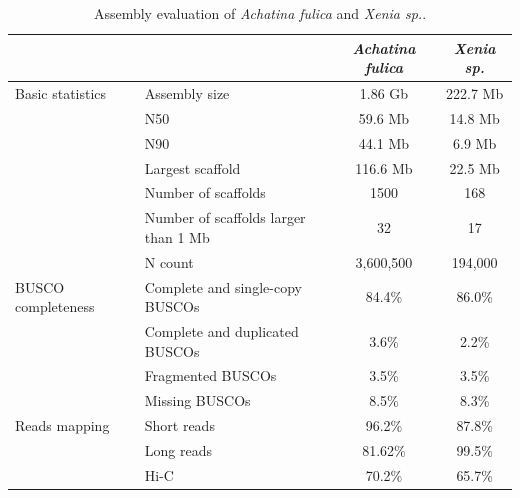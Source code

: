 \begin{table}
\centering
\caption{Assembly evaluation of \textit{Achatina fulica} and \textit{Xenia sp.}.}
\begin{tabular}{|l|l|c|c|}
\hline
                &  & \textit{Achatina fulica} & \textit{Xenia sp.} \\
\hline
Basic statistics & Assembly size & 1.86 Gb & 222.7 Mb \\
                & N50 & 59.6 Mb & 14.8 Mb \\
                & N90 & 44.1 Mb & 6.9 Mb \\
                & Largest scaffold & 116.6 Mb & 22.5 Mb \\
                & Number of scaffolds & 1500 & 168 \\
                & Number of scaffolds larger than 1 Mb & 32 & 17 \\
                & N count & 3,600,500 & 194,000 \\
\hline
BUSCO completeness & Complete and single-copy BUSCOs & 84.4\% & 86.0\% \\
                & Complete and duplicated BUSCOs & 3.6\% & 2.2\% \\
                & Fragmented BUSCOs & 3.5\% & 3.5\% \\
                & Missing BUSCOs & 8.5\% & 8.3\% \\
\hline
Reads mapping & Short reads & 96.2\% & 87.8\% \\
                & Long reads & 81.62\% & 99.5\% \\
                & Hi-C & 70.2\% & 65.7\% \\
\hline
\end{tabular}
\label{tab:assembly_stats}
\end{table}

